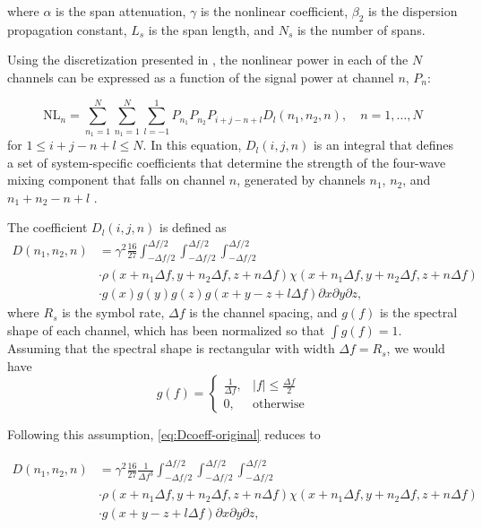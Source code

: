 \documentclass[a4paper]{article}
\begin{document}
\noindent where $\alpha$ is the span attenuation, $\gamma$ is the nonlinear coefficient, $\beta_2$ is the dispersion propagation constant, $L_s$ is the span length, and $N_s$ is the number of spans.

Using the discretization presented in \cite{Roberts2016}, the nonlinear power in each of the $N$ channels can be expressed as a function of the signal power at channel $n$, $P_n$:

\begin{equation}
	\mathrm{NL}_n = \sum_{n_1 = 1}^{N}\sum_{n_1 = 1}^N\sum_{l=-1}^{1}P_{n_1}P_{n_2}P_{i+j-n+l}D_l(n_1, n_2, n), \quad n = 1, \ldots, N
\end{equation}
for $1 \leq i+j-n+l \leq N$. In this equation, $D_l(i, j, n)$ is an integral that defines a set of system-specific coefficients that determine the strength of the four-wave mixing component that falls on channel $n$, generated by channels $n_1$, $n_2$, and $n_1 + n_2 - n+l$ \cite{Roberts2016}.

The coefficient $D_l(i, j, n)$ is defined as
\begin{align} \label{eq:Dcoeff-original}\nonumber 
D(n_1, n_2, n) &= \gamma^2\frac{16}{27}\int_{-\Delta f/2}^{\Delta f/2}\int_{-\Delta f/2}^{\Delta f/2}\int_{-\Delta f/2}^{\Delta f/2} \\ \nonumber
&\cdot\rho(x + n_1\Delta f, y + n_2\Delta f, z + n\Delta f)\chi(x + n_1\Delta f, y + n_2\Delta f, z + n\Delta f) \\
&\cdot g(x)g(y)g(z)g(x+y-z+l\Delta f)\partial x\partial y\partial z,
\end{align}
where $R_s$ is the symbol rate, $\Delta f$ is the channel spacing, and $g(f)$ is the spectral shape of each channel, which has been normalized so that $\int g(f) = 1$. Assuming that the spectral shape is rectangular with width $\Delta f = R_s$, we would have
\begin{equation}
	g(f) = \begin{cases}
	\frac{1}{\Delta f}, & |f| \leq \frac{\Delta f}{2} \\
	0, & \text{otherwise}
	\end{cases}
\end{equation} 

Following this assumption, \eqref{eq:Dcoeff-original} reduces to 

\begin{align} \label{eq:Dcoeff-original}\nonumber 
D(n_1, n_2, n) &= \gamma^2\frac{16}{27}\frac{1}{\Delta f^3}\int_{-\Delta f/2}^{\Delta f/2}\int_{-\Delta f/2}^{\Delta f/2}\int_{-\Delta f/2}^{\Delta f/2} \\ \nonumber
&\cdot\rho(x + n_1\Delta f, y + n_2\Delta f, z + n\Delta f)\chi(x + n_1\Delta f, y + n_2\Delta f, z + n\Delta f) \\
&\cdot g(x+y-z+l\Delta f)\partial x\partial y\partial z,
\end{align}
\end{document}
